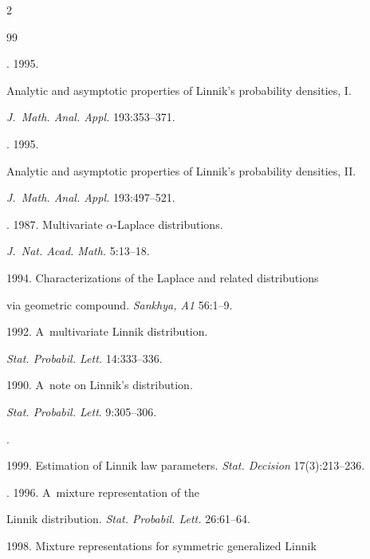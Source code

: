 \begin{multicols}{2}
{{\begin{thebibliography}{99}


. 1995. 


Analytic and asymptotic properties of Linnik's probability densities, I. 


\textit{J.~Math. Anal. Appl.} 193:353--371. 




. 1995. 


Analytic and asymptotic properties of Linnik's probability densities, II. 


\textit{J.~Math. Anal. Appl.} 193:497--521. 




. 1987. Multivariate $\alpha$-Laplace distributions. 


\textit{J.~Nat. Acad. Math.} 5:13--18. 




 1994. Characterizations of the Laplace and related distributions 


via geometric compound. \textit{Sankhya, A1} 56:1--9. 




 1992. A~multivariate Linnik distribution. 


\textit{Stat. Probabil. Lett.} 14:333--336. 




 1990. A~note on Linnik's distribution. 


\textit{Stat. Probabil. Lett}. 9:305--306. 




. 


1999. Estimation of Linnik law parameters. \textit{Stat. Decision} 17(3):213--236. 







. 1996. A~mixture representation of the 


Linnik distribution. \textit{Stat. Probabil. Lett.} 26:61--64. 




 1998. Mixture representations for symmetric generalized Linnik 



\end{thebibliography}}}
\end{multicols}
